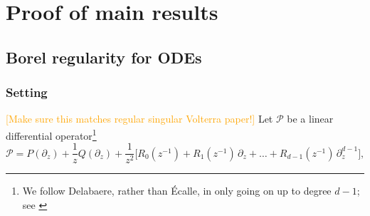 \documentclass{article}
\theoremstyle{definition}
\newcommand{\R}{\mathbb{R}}
\newcommand{\C}{\mathbb{C}}
\newtheorem{remark}[definition]{Remark}
\theoremstyle{plain}
\begin{document}


\section{Proof of main results}\label{sec:proof_main_results}
\subsection{Borel regularity for ODEs}\label{borel_reg-ODE}

\subsubsection{Setting}\label{setting-ODE}
\textcolor{orange}{[Make sure this matches regular singular Volterra paper!]} Let $\mathcal{P}$ be a linear differential operator\footnote{ We follow Delabaere, rather than \'Ecalle, in only going on up to degree $d-1$; see \cite[Footnote~1 in Section 5.2.2.1]{diverg-resurg-iii}}
\begin{equation}
\mathcal{P} = P(\partial_z) + \frac{1}{z} Q(\partial_z) + \frac{1}{z^2}\big[ R_0(z^{-1}) + R_1(z^{-1})\,\partial_z + \ldots + R_{d-1}(z^{-1})\,\partial_z^{d-1} \big],
\end{equation}
\end{document}

